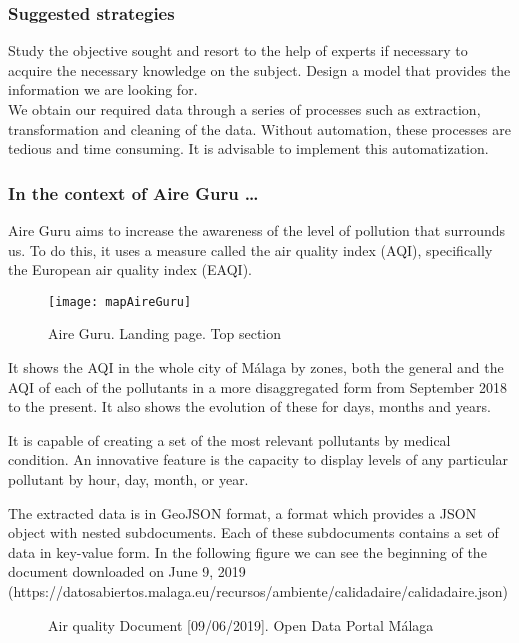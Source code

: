\subsubsection*{Suggested strategies} 

Study the objective sought and resort to the help of experts if necessary to acquire the necessary knowledge
on the subject. Design a model that provides the information we are looking for.\\

We obtain our required data through a series of processes such as extraction, transformation and
cleaning of the data. Without automation, these processes are tedious and time consuming. It is advisable to 
implement this automatization.

\subsubsection*{In the context of Aire Guru \ldots} 

Aire Guru aims to increase the awareness of the level of pollution that surrounds us. To do this, it uses a measure called
the air quality index (AQI), specifically the European air quality index (EAQI).
\newpage
\begin{figure}[ht]
    \centering
    \texttt{[image: mapAireGuru]}
    \caption{Aire Guru. Landing page. Top section}
\end{figure}

It shows the AQI in the whole city of Málaga by zones, both the general and the AQI of each of the 
pollutants in a more disaggregated form from September 2018 to the present. It also shows the evolution
of these for days, months and years.

It is capable of creating a set of the most relevant pollutants by medical condition. An innovative feature is the capacity 
to display levels of any particular pollutant by hour, day, month, or year. 

The extracted data is in GeoJSON format, a format which provides a JSON object with nested subdocuments. Each of these
subdocuments contains a set of data in key-value form.
In the following figure we can see the beginning of the document downloaded on June 9, 2019
(https://datosabiertos.malaga.eu/recursos/ambiente/calidadaire/calidadaire.json) \\

\newpage
\begin{figure}[ht]
    \centering
   \hfill
 
    \caption{Air quality Document [09/06/2019]. Open Data Portal Málaga}
    \end{figure}
    
